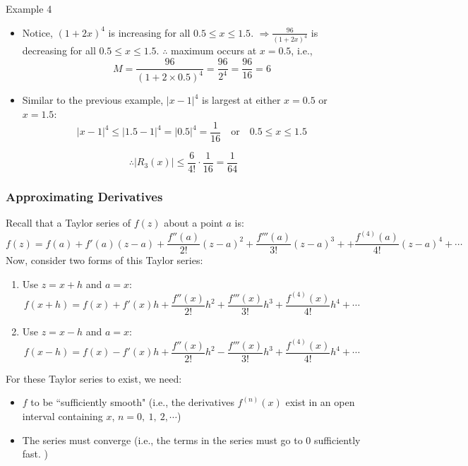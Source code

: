 \documentclass[12pt,a4paper]{article}
\begin{document}
\begin{eg}{Example 4}
\begin{enumerate}
\begin{itemize}
			\item Notice, $(1+2x)^4$ is increasing for all $0.5\leq x\leq 1.5$. 
			$\displaystyle\Rightarrow\frac{96}{(1+2x)^4}$ is decreasing for all $0.5\leq x\leq 1.5$.
			$\therefore$ maximum occurs at $x=0.5$, i.e., 
			$$M=\frac{96}{(1+2\times0.5)^4}=\frac{96}{2^4}=\frac{96}{16}=6$$
			\item Similar to the previous example, $|x-1|^4$ is largest at either $x=0.5$ or $x=1.5$: 
			$$|x-1|^4\leq|1.5-1|^4=|0.5|^4=\frac{1}{16}\quad\text{or}\quad0.5\leq x\leq1.5$$
		\end{itemize}
		$$\therefore|R_3(x)|\leq\frac{6}{4!}\cdot\frac{1}{16}=\frac{1}{64}$$
	\end{enumerate}
\end{eg}
\subsubsection{Approximating Derivatives}
Recall that a Taylor series of $f(z)$ about a point $a$ is: \[f(z)=f(a)+f'(a)(z-a)+\frac{f''(a)}{2!}(z-a)^2+\frac{f'''(a)}{3!}(z-a)^3++\frac{f^{(4)}(a)}{4!}(z-a)^4+\cdots\]
Now, consider two forms of this Taylor series: 
\begin{enumerate}
	\item Use $z=x+h$ and $a=x$: \[f(x+h)=f(x)+f'(x)h+\frac{f''(x)}{2!}h^2+\frac{f'''(x)}{3!}h^3+\frac{f^{(4)}(x)}{4!}h^4+\cdots\]
	\item Use $z=x-h$ and $a=x$: \[f(x-h)=f(x)-f'(x)h+\frac{f''(x)}{2!}h^2-\frac{f'''(x)}{3!}h^3+\frac{f^{(4)}(x)}{4!}h^4+\cdots\]	
\end{enumerate}
\begin{rmk}{For these Taylor series to exist, we need:}
	\begin{itemize}
		\item $f$ to be ``sufficiently smooth" (i.e., the derivatives $f^{(n)}(x)$ exist in an open interval containing $x$, $n=0,\ 1,\ 2,\cdots$)
		\item The series must converge (i.e., the terms in the series must go to $0$ sufficiently fast. )
	\end{itemize}	
\end{rmk}
\end{document}
